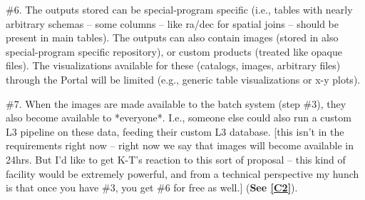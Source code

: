 \documentclass[DM,lsstdraft,toc]{lsstdoc}
\begin{document}
\#6. The outputs stored can be special-program specific (i.e., tables with nearly arbitrary schemas -- some columns -- like ra/dec for spatial joins -- should be present in main tables). The outputs can also contain images (stored in also special-program specific repository), or custom products (treated like opaque files). The visualizations available for these (catalogs, images, arbitrary files) through the Portal will be limited (e.g., generic table visualizations or x-y plots).

\#7. When the images are made available to the batch system (step \#3), they also become available to *everyone*. I.e., someone else could also run a custom L3 pipeline on these data, feeding their custom L3 database. [this isn't in the requirements right now -- right now we say that images will become available in 24hrs. But I'd like to get K-T's reaction to this sort of proposal -- this kind of facility would be extremely powerful, and from a technical perspective my hunch is that once you have \#3, you get \#6 for free as well.]
 (\textbf{See \ref{C2}}).



\end{document}

